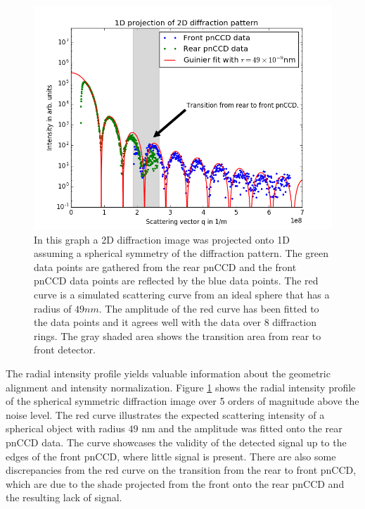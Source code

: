 \begin{figure}
	\centering
		\includegraphics[height=0.50\textwidth]{images/pnCCD-1d-sum.png}
	\caption[Spherical projection of 2D diffraction image in 1D.]{In this graph a 2D diffraction image was projected onto 1D assuming a spherical symmetry of the diffraction pattern. The green data points are gathered from the rear pnCCD and the front pnCCD data points are reflected by the blue data points. The red curve is a simulated scattering curve from an ideal sphere that has a radius of $49 nm$. The amplitude of the red curve has been fitted to the data points and it agrees well with the data over 8 diffraction rings. The gray shaded area shows the transition area from rear to front detector.}
	\label{fig:pnCCD-1d-sum}
\end{figure}
The radial intensity profile yields valuable information about the geometric alignment and intensity normalization. Figure \ref{fig:pnCCD-1d-sum} shows the radial intensity profile of the spherical symmetric diffraction image over 5 orders of magnitude above the noise level. The red curve illustrates the expected scattering intensity of a spherical object with radius $49$ nm and the amplitude was fitted onto the rear pnCCD data. The curve showcases the validity of the detected signal up to the edges of the front pnCCD, where little signal is present. There are also some discrepancies from the red curve on the transition from the rear to front pnCCD, which are due to the shade projected from the front onto the rear pnCCD and the resulting lack of signal.
%
%
%
